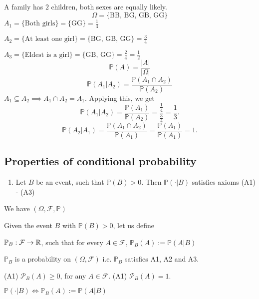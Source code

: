 \documentclass[10pt, a4paper]{article}
\begin{document}
\begin{example}
    A family has $2$ children, both sexes are equally likely.
    \[
    \Omega = \{\text{BB, BG, GB, GG}\}
    \]
    $A_1 = \{\text{Both girls}\} = \{\text{GG}\} = \frac{1}{4}$
    
    $A_2 = \{\text{At least one girl}\} = \{\text{BG, GB, GG}\} = \frac{3}{4}$

    $A_3 = \{\text{Eldest is a girl}\} = \{\text{GB, GG}\} = \frac{2}{4} = \frac{1}{2}$
    \[
    \mathbb{P}(A) = \frac{|A|}{|\Omega|}
    \]
    \[
    \mathbb{P}(A_1 | A_2) = \frac{\mathbb{P}(A_1 \cap A_2)}{\mathbb{P}(A_2)}
    \]
    $A_1 \subseteq A_2 \implies A_1 \cap A_2 = A_1$. Applying this, we get
    \[
    \mathbb{P}(A_1 | A_2) = \frac{\mathbb{P}(A_1)}{\mathbb{P}(A_2)} = \frac{\frac{1}{4}}{\frac{3}{4}} = \frac{1}{3}.
    \]
    \[
    \mathbb{P}(A_2 | A_1) = \frac{\mathbb{P}(A_1 \cap A_2)}{\mathbb{P}(A_1)} = \frac{\mathbb{P}(A_1)}{\mathbb{P}(A_1)} = 1.
    \]
\end{example}

\subsection{Properties of conditional probability}
\begin{enumerate}[label = P\arabic*]
    \item Let $B$ be an event, such that $\mathbb{P}(B) > 0$. Then $\mathbb{P}(\cdot | B)$ satisfies axioms (A1) - (A3)
\end{enumerate}

We have $(\Omega, \mathcal{F}, \mathbb{P})$

Given the event $B$ with $\mathbb{P}(B) > 0$, let us define

$\mathbb{P}_B : \mathcal{F} \rightarrow \mathbb{R}$, such that for every $A \in \mathcal{F},\,\mathbb{P}_B(A) := \mathbb{P}(A | B)$

$\mathbb{P}_B$ is a probability on $(\Omega, \mathcal{F})$ i.e. $\mathbb{P}_B$ satisfies A1, A2 and A3.

(A1) $\mathcal{P}_B(A) \geq 0$, for any $A \in \mathcal{F}$.
(A1) $\mathcal{P}_B(A) = 1$.

$\mathbb{P}(\cdot | B) \iff \mathbb{P}_B(A) := \mathbb{P}(A | B)$
\end{document}
